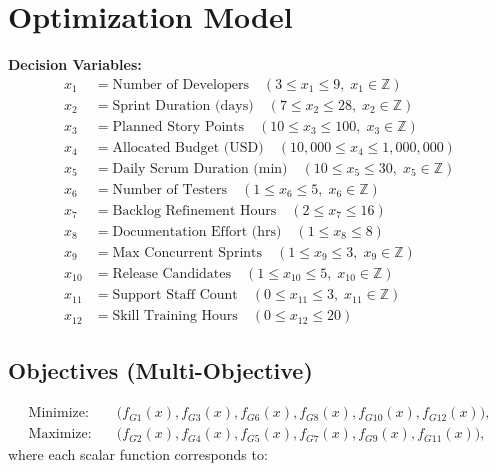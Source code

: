 \documentclass{article}
\begin{document}
\section*{Optimization Model}

\textbf{Decision Variables:}
\[
\begin{aligned}
x_1 &= \text{Number of Developers} \quad(3 \le x_1 \le 9,\; x_1 \in \mathbb{Z})\\
x_2 &= \text{Sprint Duration (days)} \quad(7 \le x_2 \le 28,\; x_2 \in \mathbb{Z})\\
x_3 &= \text{Planned Story Points} \quad(10 \le x_3 \le 100,\; x_3 \in \mathbb{Z})\\
x_4 &= \text{Allocated Budget (USD)} \quad(10{,}000 \le x_4 \le 1{,}000{,}000)\\
x_5 &= \text{Daily Scrum Duration (min)} \quad(10 \le x_5 \le 30,\; x_5 \in \mathbb{Z})\\
x_6 &= \text{Number of Testers} \quad(1 \le x_6 \le 5,\; x_6 \in \mathbb{Z})\\
x_7 &= \text{Backlog Refinement Hours} \quad(2 \le x_7 \le 16)\\
x_8 &= \text{Documentation Effort (hrs)} \quad(1 \le x_8 \le 8)\\
x_9 &= \text{Max Concurrent Sprints} \quad(1 \le x_9 \le 3,\; x_9 \in \mathbb{Z})\\
x_{10} &= \text{Release Candidates} \quad(1 \le x_{10} \le 5,\; x_{10} \in \mathbb{Z})\\
x_{11} &= \text{Support Staff Count} \quad(0 \le x_{11} \le 3,\; x_{11} \in \mathbb{Z})\\
x_{12} &= \text{Skill Training Hours} \quad(0 \le x_{12} \le 20)
\end{aligned}
\]

\subsection*{Objectives (Multi-Objective)}
\[
\begin{aligned}
\text{Minimize:}\quad & \bigl(f_{G1}(x), f_{G3}(x), f_{G6}(x), f_{G8}(x), f_{G10}(x), f_{G12}(x)\bigr),\\
\text{Maximize:}\quad & \bigl(f_{G2}(x), f_{G4}(x), f_{G5}(x), f_{G7}(x), f_{G9}(x), f_{G11}(x)\bigr),
\end{aligned}
\]
where each scalar function corresponds to:
\end{document}
